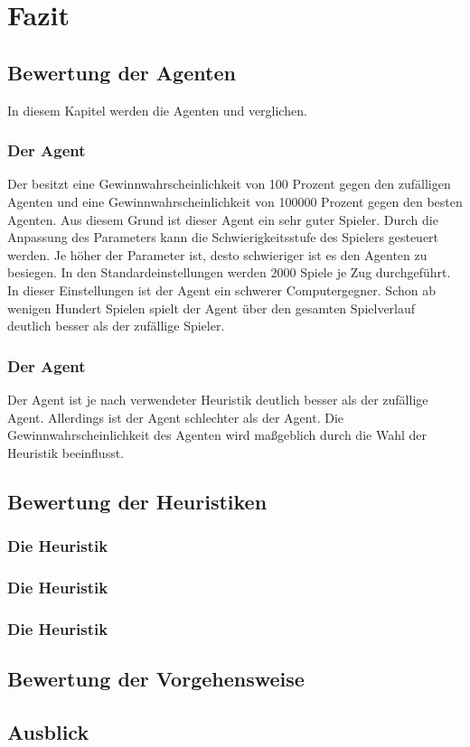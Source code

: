 \chapter{Fazit}

\section{Bewertung der Agenten}
In diesem Kapitel werden die Agenten  und  verglichen.
\subsection{Der Agent }
Der  besitzt eine Gewinnwahrscheinlichkeit von 100 Prozent gegen den zufälligen Agenten und eine Gewinnwahrscheinlichkeit von 100000 Prozent gegen den besten  Agenten. Aus diesem Grund ist dieser Agent ein sehr guter Spieler. Durch die Anpassung des Parameters  kann die Schwierigkeitsstufe des Spielers gesteuert werden. Je höher der Parameter ist, desto schwieriger ist es den Agenten zu besiegen. In den Standardeinstellungen werden 2000  Spiele je Zug durchgeführt. In dieser Einstellungen ist der Agent ein schwerer Computergegner. Schon ab wenigen Hundert Spielen spielt der Agent über den gesamten Spielverlauf deutlich besser als der zufällige Spieler. 
\subsection{Der Agent }
Der  Agent ist je nach verwendeter Heuristik deutlich besser als der zufällige Agent. Allerdings ist  der Agent schlechter als der  Agent. Die Gewinnwahrscheinlichkeit des Agenten wird maßgeblich durch die Wahl der Heuristik beeinflusst.

\section{Bewertung der Heuristiken}
\subsection{Die Heuristik }
\subsection{Die Heuristik }
\subsection{Die Heuristik }

\section{Bewertung der Vorgehensweise}

\section{Ausblick}

